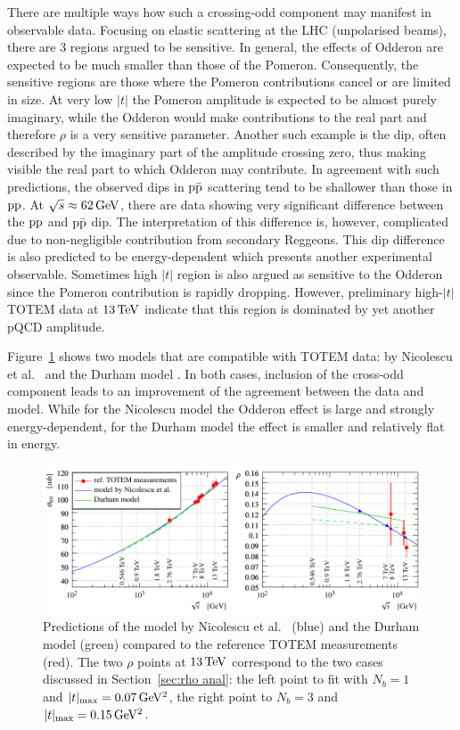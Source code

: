 There are multiple ways how such a crossing-odd component may manifest in observable data. Focusing on elastic scattering at the LHC (unpolarised beams), there are 3 regions argued to be sensitive. In general, the effects of Odderon are expected to be much smaller than those of the Pomeron. Consequently, the sensitive regions are those where the Pomeron contributions cancel or are limited in size. At very low $|t|$ the Pomeron amplitude is expected to be almost purely imaginary, while the Odderon would make contributions to the real part and therefore $\rho$ is a very sensitive parameter. Another such example is the dip, often described by the imaginary part of the amplitude crossing zero, thus making visible the real part to which Odderon may contribute. In agreement with such predictions, the observed dips in $\rm p\bar p$ scattering tend to be shallower than those in $\rm pp$. At $\sqrt s \approx 62\,{\rm GeV}$, there are data showing very significant difference between the $\rm pp$ and $\rm p\bar p$ dip. The interpretation of this difference is, however, complicated due to non-negligible contribution from secondary Reggeons. This dip difference is also predicted to be energy-dependent which presents another experimental observable. Sometimes high $|t|$ region is also argued as sensitive to the Odderon since the Pomeron contribution is rapidly dropping. However, preliminary high-$|t|$ TOTEM data at $13\,{\rm TeV}$ indicate that this region is dominated by yet another pQCD amplitude.

Figure~\ref{fig:match models} shows two models that are compatible with TOTEM data: by Nicolescu et al.~\cite{nicolescu-2017} and the Durham model \cite{durham-2017-note}. In both cases, inclusion of the cross-odd component leads to an improvement of the agreement between the data and model. While for the Nicolescu model the Odderon effect is large and strongly energy-dependent, for the Durham model the effect is smaller and relatively flat in energy.

\begin{figure}
\vskip-5mm
\begin{center}
\includegraphics{fig/matching_models_si_tot_rho.pdf}
\caption{%
Predictions of the model by Nicolescu et al.~\cite{nicolescu-2017} (blue) and the Durham model \cite{durham-2017-note} (green) compared to the reference TOTEM measurements (red). The two $\rho$ points at $13\,{\rm TeV}$ correspond to the two cases discussed in Section~\ref{sec:rho anal}: the left point to fit with $N_b=1$ and $|t|_{\rm max} = 0.07\,{\rm GeV^2}$, the right point to $N_b=3$ and $|t|_{\rm max} = 0.15\,{\rm GeV^2}$.
}
\label{fig:match models}
\end{center}
\end{figure}
